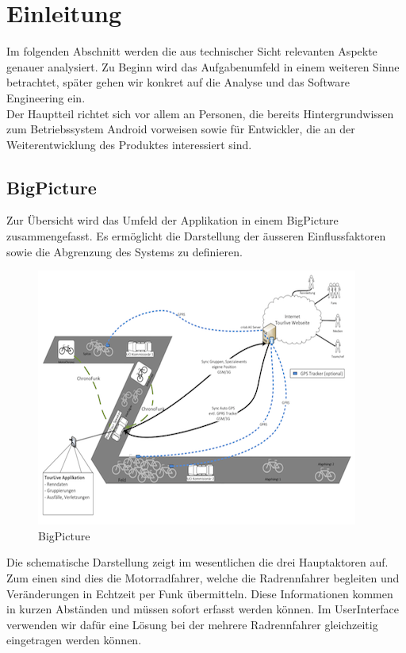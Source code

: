 \chapter{Einleitung}

Im folgenden Abschnitt werden die aus technischer Sicht relevanten Aspekte genauer analysiert. Zu Beginn wird das Aufgabenumfeld in einem weiteren Sinne betrachtet, später gehen wir konkret auf die Analyse und das Software Engineering ein.
\\

Der Hauptteil richtet sich vor allem an Personen, die bereits Hintergrundwissen zum Betriebssystem Android vorweisen sowie für Entwickler, die an der Weiterentwicklung des Produktes interessiert sind.

\section{BigPicture}
Zur Übersicht wird das Umfeld der Applikation in einem BigPicture zusammengefasst. Es ermöglicht die Darstellung der äusseren Einflussfaktoren sowie die Abgrenzung des Systems zu definieren.

\begin{figure}[h!]
\caption{BigPicture}
\centering
\includegraphics{05technischerbericht/images/big_picture.png}
\end{figure} 

Die schematische Darstellung zeigt im wesentlichen die drei Hauptaktoren auf. Zum einen sind dies die Motorradfahrer, welche die Radrennfahrer begleiten und Veränderungen in Echtzeit per Funk übermitteln. Diese Informationen kommen in kurzen Abständen und müssen sofort erfasst werden können. Im UserInterface verwenden wir dafür eine Lösung bei der mehrere Radrennfahrer gleichzeitig eingetragen werden können.
\\

